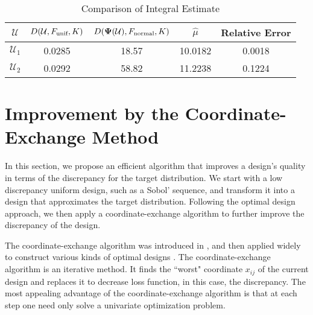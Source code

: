 \documentclass[graybox]{svmult}
\newcommand{\vPsi}{\boldsymbol{\Psi}}
\newcommand{\Udes}{\mathcal{U}}
\newcommand{\unif}{\textup{unif}}
\newcommand{\normal}{\textup{normal}}
\begin{document}
\begin{example}
\begin{table}[htbp]
  \centering
  \caption{Comparison of Integral Estimate}
    \begin{tabular}{ccccc}
   $\Udes$       & $D(\Udes,F_\unif, K)$     & $D(\vPsi(\Udes),F_\normal, K)$     & $\hat{\mu}$  & Relative Error\\
    \toprule
    $\Udes_1$     &   0.0285    &  18.57     & 10.0182 & 0.0018\\
    $\Udes_2$     &  0.0292      &  58.82     & 11.2238 & 0.1224
    \end{tabular}%
  \label{tab:badexample}%
\end{table}%




\end{example}

\section{Improvement by the Coordinate-Exchange Method}\label{sec:CoordEx}

In this section, we propose an efficient algorithm that improves a design's quality in terms of the discrepancy for the target distribution. 
We start with a low discrepancy uniform design, such as a Sobol' sequence, and transform it into a design that approximates the target distribution. 
Following the optimal design approach, we then apply a coordinate-exchange algorithm to further improve the discrepancy of the design.

The coordinate-exchange algorithm was introduced in \cite{meyer1995coordinate}, and then applied widely to construct various kinds of optimal designs \cites{sambo2014coordinate,overstall2017bayesian,kang2018stochastic}. 
The coordinate-exchange algorithm is an iterative method.
It finds the ``worst" coordinate $x_{ij}$ of the current design and replaces it to decrease loss function, in this case, the discrepancy. 
The most appealing advantage of the coordinate-exchange algorithm is that at each step one need only solve a univariate optimization problem.
\end{document}

